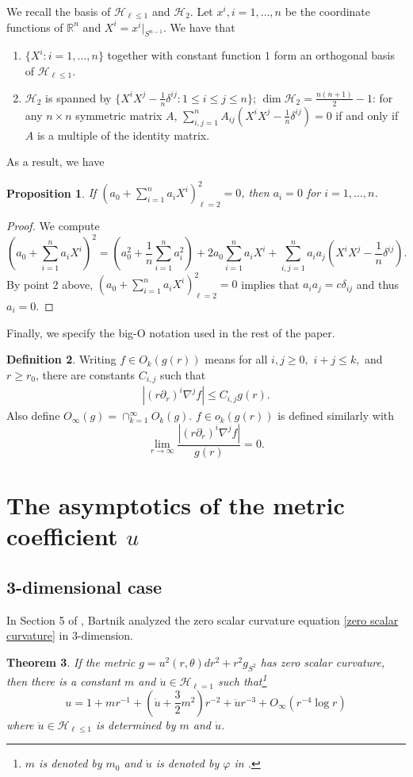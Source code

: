 \documentclass[12pt,twoside]{article}
\theoremstyle{plain}
\newtheorem{theorem}{Theorem}[section]
\newtheorem{prop}[theorem]{Proposition}
\theoremstyle{definition}
\newtheorem{defn}[theorem]{Definition}
\theoremstyle{remark}
\newcommand{\vphi}{\varphi}
\newcommand{\pl}{\partial}
\newcommand{\na}{\nabla}
\newcommand{\lt}{\left}
\newcommand{\rt}{\right}
\newcommand{\rw}{\rightarrow}
\newcommand{\R}{\mathbb{R}}
\numberwithin{equation}{section}
\begin{document}
We recall the basis of $\mathcal{H}_{\ell \le 1}$ and $\mathcal{H}_{2}.$ Let $x^i, i = 1, \ldots, n$ be the coordinate functions of $\R^n$ and $X^i = x^i \big|_{S^{n-1}}$. We have that
\begin{enumerate}
\item $\{ X^i: i =1, \ldots, n \}$ together with constant function $1$ form an orthogonal basis of $\mathcal{H}_{\ell\le 1}$.
\item $\mathcal{H}_2$ is spanned by $\{ X^iX^j - \frac{1}{n} \delta^{ij}: 1 \le i \le j \le n\}$; $\dim \mathcal{H}_2 = \frac{n(n+1)}{2}-1$: for any $n \times n$ symmetric matrix $A$, $\sum_{i,j=1}^n A_{ij} (X^iX^j - \frac{1}{n}\delta^{ij}) =0$ if and only if $A$ is a multiple of the identity matrix. 
\end{enumerate}
As a result, we have
\begin{prop}\label{udot_square_l=2}
If $\lt( a_0 + \sum_{i=1}^n a_i X^i \rt)^2_{\ell=2} =0$, then $a_i=0$ for $i = 1, \ldots, n$.
\end{prop}
\begin{proof}
We compute
\[ (a_0 + \sum_{i=1}^n a_i X^i)^2 = (a_0^2 + \frac{1}{n} \sum_{i=1}^n a_i^2) + 2 a_0 \sum_{i=1}^n a_i X^i + \sum_{i,j=1}^n a_i a_j (X^iX^j - \frac{1}{n}\delta^{ij}). \]
 By point 2 above, $\lt( a_0 + \sum_{i=1}^n a_i X^i \rt)^2_{\ell=2} =0$ implies that $a_ia_j = c \delta_{ij}$ and thus $a_i=0$.
\end{proof}
Finally, we specify the big-O notation used in the rest of the paper.
\begin{defn}
Writing $f \in O_k (g(r))$ means for all $i,j \ge 0,$ $i+j \le k,$ and $r \ge r_0$, there are constants $C_{i,j}$ such that
\begin{align*}
|(r\pl_r)^i \na^j f| \le C_{i,j} g(r).
\end{align*}
Also define $O_\infty(g) = \cap_{k=1}^\infty O_k(g)$. $f \in o_k (g(r))$ is defined similarly with
\[ \lim_{r\rw\infty} \frac{|(r\pl_r)^i \na^j f|}{g(r)} =0.\]
\end{defn}


\section{The asymptotics of the metric coefficient $u$}\label{section:asymptotics of the lapse}
\subsection{3-dimensional case}
In Section 5 of \cite{B}, Bartnik analyzed the zero scalar curvature equation \eqref{zero scalar curvature} in 3-dimension.  
\begin{theorem}\cite[Theorem 5.1]{B}\label{Bartnik}
If the metric $g = u^2(r,\theta)dr^2 + r^2 g_{S^2}$ has zero scalar curvature, then there is a constant $m$ and $\dot u \in \mathcal{H}_{\ell=1}$ such that\footnote{$m$ is denoted by $m_0$ and $\dot u$ is denoted by $\vphi$ in \cite{B}.} 
\[ u = 1 + m r^{-1} + (\dot u+ \frac{3}{2}m^2) r^{-2} + \ddot u r^{-3} + O_{\infty}(r^{-4}\log r) \]
where $\ddot u \in \mathcal{H}_{\ell\le 1}$ is determined by $m$ and $\dot u$.

\end{theorem}
\end{document}
